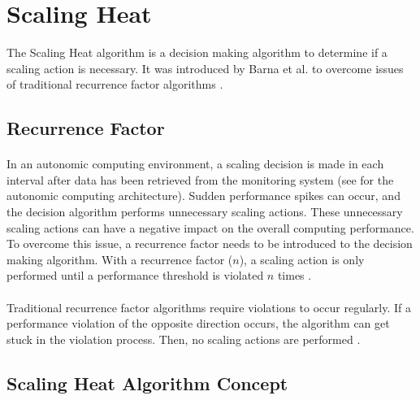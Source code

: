 \newpage
\section{Scaling Heat}
\label{sec:04_scal-heat}
The Scaling Heat algorithm is a decision making algorithm to determine if a scaling action is necessary.
It was introduced by Barna et al. \cite{Barna2017ElasticContainerApps} to overcome issues of traditional recurrence factor algorithms \cite{Barna2017ElasticContainerApps}.


\subsection{Recurrence Factor}
\paragraph{}
In an autonomic computing environment, a scaling decision is made in each interval after data has been retrieved from the monitoring system (see  for the autonomic computing architecture). 
Sudden performance spikes can occur, and the decision algorithm performs unnecessary scaling actions.
These unnecessary scaling actions can have a negative impact on the overall computing performance.
To overcome this issue, a recurrence factor needs to be introduced to the decision making algorithm.
With a recurrence factor ($n$), a scaling action is only performed until a performance threshold is violated $n$ times \cite{Barna2017ElasticContainerApps}.


\paragraph{}Traditional recurrence factor algorithms require violations to occur regularly. If a performance violation of the opposite direction occurs, the algorithm can get stuck in the violation process. Then, no scaling actions are performed \cite{Barna2017ElasticContainerApps}.


\subsection{Scaling Heat Algorithm Concept}
\label{sec:04_background_scaling-heat}
